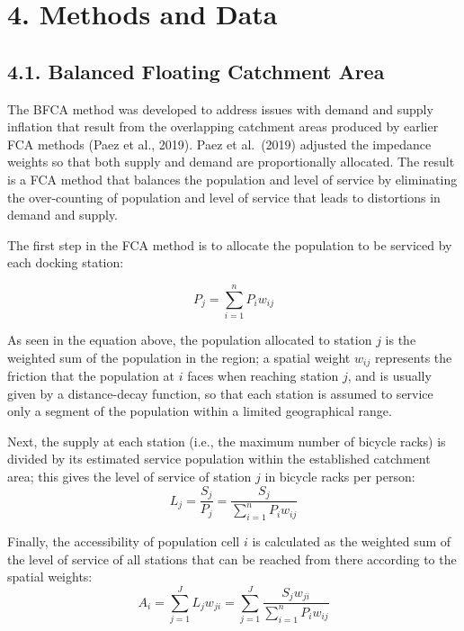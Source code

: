 \documentclass[]{elsarticle} %
\begin{document}
\hypertarget{sec:methods}{%
\section{4. Methods and Data}\label{sec:methods}}

\hypertarget{balanced-floating-catchment-area}{%
\subsection{4.1. Balanced Floating Catchment
Area}\label{balanced-floating-catchment-area}}

The BFCA method was developed to address issues with demand and supply
inflation that result from the overlapping catchment areas produced by
earlier FCA methods (Paez et al., 2019). Paez et al.~(2019) adjusted the
impedance weights so that both supply and demand are proportionally
allocated. The result is a FCA method that balances the population and
level of service by eliminating the over-counting of population and
level of service that leads to distortions in demand and supply.

The first step in the FCA method is to allocate the population to be
serviced by each docking station:

\begin{equation}
\label{eq:population-allocation}
P_j = {\sum_{i = 1}^{n} P_i{w_{ij}}}
\end{equation}

As seen in the equation above, the population allocated to station \(j\)
is the weighted sum of the population in the region; a spatial weight
\(w_{ij}\) represents the friction that the population at \(i\) faces
when reaching station \(j\), and is usually given by a distance-decay
function, so that each station is assumed to service only a segment of
the population within a limited geographical range.

Next, the supply at each station (i.e., the maximum number of bicycle
racks) is divided by its estimated service population within the
established catchment area; this gives the level of service of station
\(j\) in bicycle racks per person: \begin{equation}
\label{eq:level-of-service}
L_j = \frac {S_j}{P_j} = \frac {S_j}{{\sum_{i = 1}^{n} P_i{w_{ij}}}}
\end{equation}

Finally, the accessibility of population cell \(i\) is calculated as the
weighted sum of the level of service of all stations that can be reached
from there according to the spatial weights: \begin{equation}
\label{eq:FCA-accessibility}
A_i = {\sum_{j = 1}^{J} L_j{w_{ji}}} = {\sum_{j = 1}^{J} \frac {S_j{w_{ji}}}{\sum_{i = 1}^{n} P_i{w_{ij}}}}
\end{equation}
\end{document}
